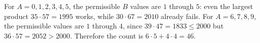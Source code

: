 For $A=0,1,2,3,4,5$, the permissible $B$ values are $1$ through $5$: even the largest product $35\cdot57=1995$ works, while $30\cdot67=2010$ already fails. For $A=6,7,8,9$, the permissible values are $1$ through $4$, since $39\cdot47=1833\le2000$ but $36\cdot57=2052>2000$. Therefore the count is $6\cdot5+4\cdot4=\boxed{46}$.
